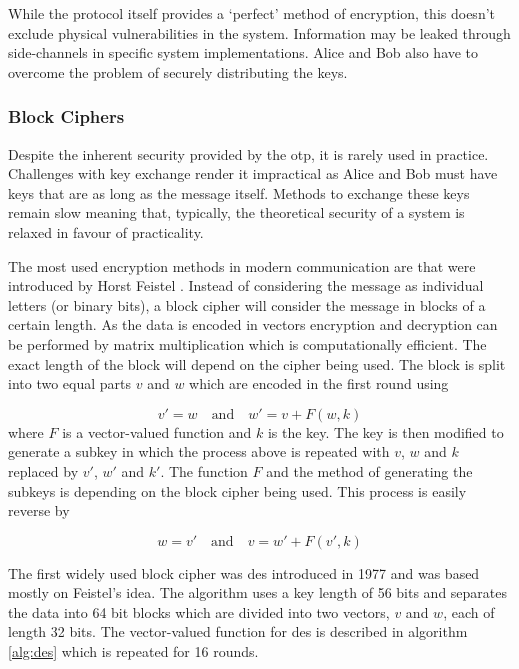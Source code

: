 
While the protocol itself provides a `perfect' method of encryption, this doesn't exclude physical vulnerabilities in the system. Information may be leaked through side-channels in specific system implementations. Alice and Bob also have to overcome the problem of securely distributing the keys. 

\subsubsection{Block Ciphers}

Despite the inherent security provided by the \ac{otp}, it is rarely used in practice. Challenges with key exchange render it impractical as Alice and Bob must have keys that are as long as the message itself. Methods to exchange these keys remain slow meaning that, typically, the theoretical security of a system is relaxed in favour of practicality. 

The most used encryption methods in modern communication are  that were introduced by Horst Feistel \cite{feistel1970cryptographic}. Instead of considering the message as individual letters (or binary bits), a block cipher will consider the message in blocks of a certain length. As the data is encoded in vectors encryption and decryption can be performed by matrix multiplication which is computationally efficient. The exact length of the block will depend on the cipher being used. The block is split into two equal parts $v$ and $w$ which are encoded in the first round using 

\begin{equation}
	v' = w \quad \text{and} \quad w' = v + F(w, k)
\end{equation}
where $F$ is a vector-valued function and $k$ is the key. The key is then modified to generate a subkey in which the process above is repeated with $v$, $w$ and $k$ replaced by $v'$, $w'$ and $k'$. The function $F$ and the method of generating the subkeys is depending on the block cipher being used. This process is easily reverse by

\begin{equation}
	w = v' \quad \text{and} \quad v = w' + F(v', k)
\end{equation}

The first widely used block cipher was \ac{des} introduced in 1977 \cite{DES1977} and was based mostly on Feistel's idea. The algorithm uses a key length of 56 bits and separates the data into 64 bit blocks which are divided into two vectors, $v$ and $w$, each of length 32 bits. The vector-valued function for \ac{des} is described in algorithm \ref{alg:des} which is repeated for 16 rounds.

